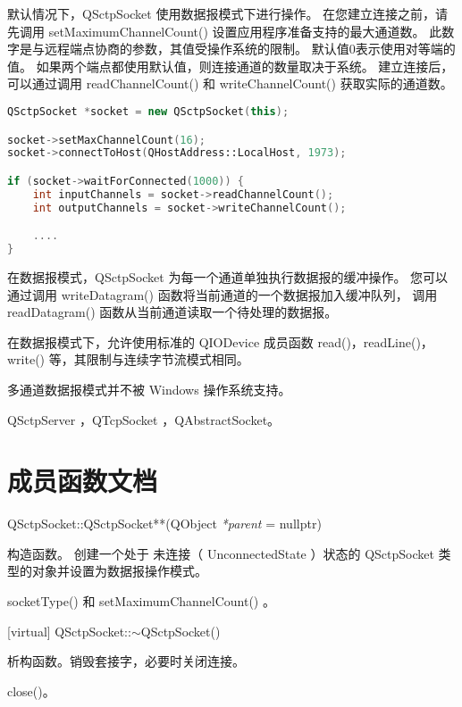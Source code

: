 默认情况下，QSctpSocket 使用数据报模式下进行操作。 
在您建立连接之前，请先调用 setMaximumChannelCount() 设置应用程序准备支持的最大通道数。 
此数字是与远程端点协商的参数，其值受操作系统的限制。 默认值0表示使用对等端的值。
如果两个端点都使用默认值，则连接通道的数量取决于系统。 建立连接后，
可以通过调用 readChannelCount() 和 writeChannelCount() 获取实际的通道数。

\begin{lstlisting}[language=C++]
 QSctpSocket *socket = new QSctpSocket(this);

socket->setMaxChannelCount(16);
socket->connectToHost(QHostAddress::LocalHost, 1973);

if (socket->waitForConnected(1000)) {
	int inputChannels = socket->readChannelCount();
	int outputChannels = socket->writeChannelCount();

	....
}
\end{lstlisting}


在数据报模式，QSctpSocket 为每一个通道单独执行数据报的缓冲操作。
您可以通过调用 writeDatagram() 函数将当前通道的一个数据报加入缓冲队列，
调用 readDatagram() 函数从当前通道读取一个待处理的数据报。

在数据报模式下，允许使用标准的 QIODevice 成员函数 read()，readLine()，
write() 等，其限制与连续字节流模式相同。


\begin{notice}
多通道数据报模式并不被 Windows 操作系统支持。
\end{notice}

\begin{seeAlso}
QSctpServer ，QTcpSocket ，QAbstractSocket。
\end{seeAlso}

\section{成员函数文档}

QSctpSocket::QSctpSocket**(QObject \emph{*parent} = nullptr)

构造函数。
创建一个处于 未连接（ UnconnectedState ）状态的 QSctpSocket 类型的对象并设置为数据报操作模式。

\begin{seeAlso}
socketType() 和 setMaximumChannelCount() 。
\end{seeAlso}

[virtual] QSctpSocket::$\sim$QSctpSocket()

析构函数。销毁套接字，必要时关闭连接。

\begin{seeAlso}
close()。
\end{seeAlso}

